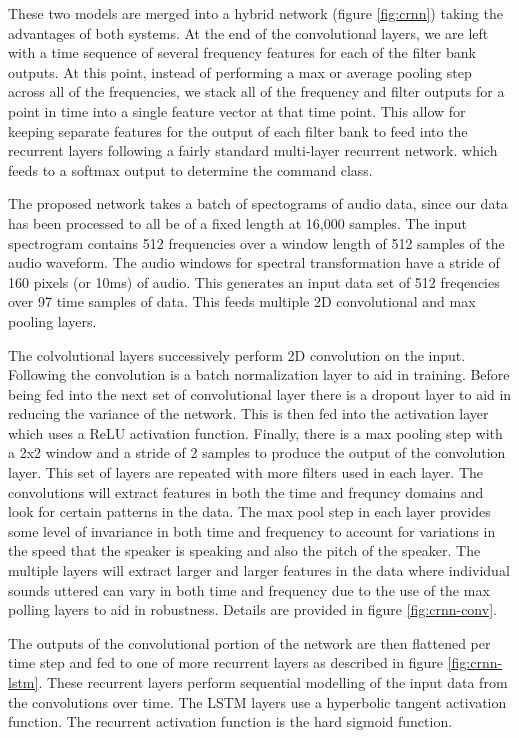 \documentclass{article}
\begin{document}
These two models are merged into a hybrid network (figure
\ref{fig:crnn}) taking the
advantages of both systems. At the end of the convolutional layers, we
are left with a time sequence of several frequency features for each
of the filter bank outputs. At this point, instead of performing a max
or average pooling step across all of the frequencies, we stack all of
the frequency and filter outputs for a point in time into a single
feature vector at that time point. This allow for keeping separate
features for the output of each filter bank to feed into the recurrent
layers following a fairly standard multi-layer recurrent
network. which feeds to a softmax output to determine the command
class.

The proposed network takes a batch of spectograms of audio data, since
our data has been processed to all be of a fixed length at 16,000
samples. The input spectrogram contains 512 frequencies over a window
length of 512 samples of the audio waveform. The audio windows for spectral
transformation have a stride of 160 pixels (or 10ms) of audio. This
generates an input data set of 512 freqencies over 97 time samples of
data. This feeds multiple 2D convolutional and max pooling layers.

The colvolutional layers successively perform 2D convolution on the
input. Following the convolution is a batch normalization layer to aid
in training. Before being fed into the next set of convolutional layer
there is a dropout layer to aid in reducing the variance of the
network. This is then fed into the activation layer which uses a
ReLU activation function. Finally, there is a max pooling step with a
2x2 window and a stride of 2 samples to produce the output of the
convolution layer. This set of layers are repeated with more filters
used in each layer. The convolutions will extract features in both the
time and frequncy domains and look for certain patterns in the
data. The max pool step in each layer provides some level of
invariance in both time and frequency to account for variations in the
speed that the speaker is speaking and also the pitch of the
speaker. The multiple layers will extract larger and larger features
in the data where individual sounds uttered can vary in both time and
frequency due to the use of the max polling layers to aid in
robustness. Details are provided in figure \ref{fig:crnn-conv}.

The outputs of the convolutional portion of the network are then
flattened per time step and fed to one of more recurrent layers as
described in figure \ref{fig:crnn-lstm}. These
recurrent layers perform sequential modelling of the input data from
the convolutions over time. The LSTM layers use a hyperbolic tangent
activation function. The recurrent activation function is the hard
sigmoid function.
\end{document}
